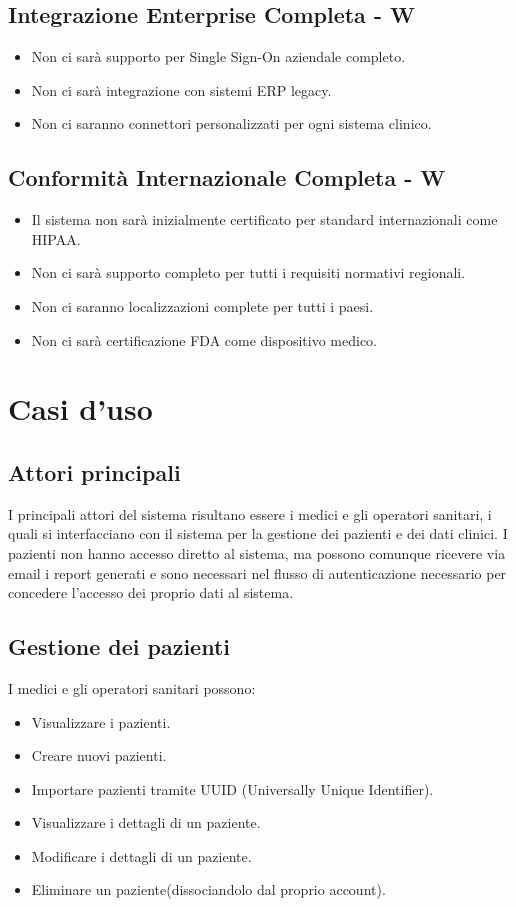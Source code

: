 \documentclass[12pt,a4paper,oneside]{report}
\begin{document}
\subsection{Integrazione Enterprise Completa - W}

\begin{itemize}
    \item Non ci sarà supporto per Single Sign-On aziendale completo.
    \item Non ci sarà integrazione con sistemi ERP legacy.
    \item Non ci saranno connettori personalizzati per ogni sistema clinico.
\end{itemize}

\subsection{Conformità Internazionale Completa - W}

\begin{itemize}
    \item Il sistema non sarà inizialmente certificato per standard internazionali come HIPAA.
    \item Non ci sarà supporto completo per tutti i requisiti normativi regionali.
    \item Non ci saranno localizzazioni complete per tutti i paesi.
    \item Non ci sarà certificazione FDA come dispositivo medico.

\end{itemize}

\section{Casi d'uso}
\subsection{Attori principali}
I principali attori del sistema risultano essere i medici e gli operatori sanitari, i quali si interfacciano con il sistema per la gestione dei pazienti e dei dati clinici.
I pazienti non hanno accesso diretto al sistema, ma possono comunque ricevere via email i report generati e sono necessari nel flusso di autenticazione necessario per concedere l'accesso dei proprio dati al sistema.
\subsection{Gestione dei pazienti}
I medici e gli operatori sanitari possono:
\begin{itemize}
    \item Visualizzare i pazienti.
    \item Creare nuovi pazienti.
  \item Importare pazienti tramite UUID (Universally Unique Identifier).
    \item Visualizzare i dettagli di un paziente.
    \item Modificare i dettagli di un paziente.
    \item Eliminare un paziente(dissociandolo dal proprio account).
\end{itemize}
\end{document}
